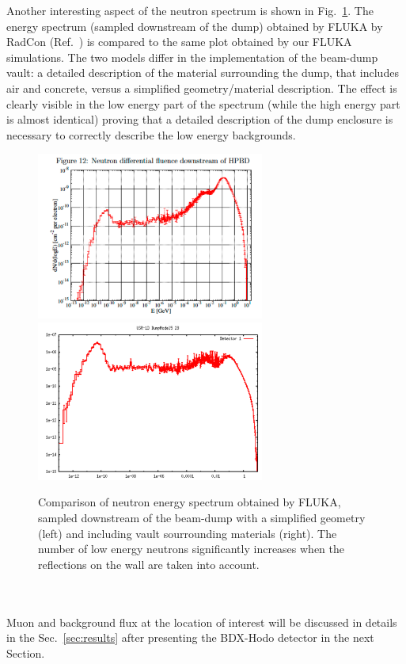 Another interesting aspect of the neutron spectrum is shown in Fig.~\ref{fig:n-lowE}. The energy spectrum (sampled downstream of the dump) obtained by FLUKA by RadCon (Ref.~\cite{jnote-bd}) is compared to the same plot obtained by our FLUKA simulations. The two models differ in the implementation of the  beam-dump vault: a detailed description of the material surrounding the dump,  that includes air and concrete,  versus a simplified geometry/material description.   The effect is clearly visible in the low energy part of the spectrum (while the high energy part is almost identical) proving that a detailed description of the dump enclosure is necessary to correctly describe the low energy backgrounds.
\begin{figure}[h!] 
\center
\includegraphics[width=7.5cm]{figs/bg-lowN-george.pdf}    
\includegraphics[width=7.5cm]{figs/NeutronsDumpComparisonDnDlogE_1D.pdf}   
\caption{Comparison of neutron energy spectrum obtained by FLUKA, sampled downstream of the beam-dump with a simplified geometry (left) and including vault sourrounding materials (right). The number of low energy neutrons significantly increases when the reflections on the wall are taken into account.}
\label{fig:n-lowE}
\end{figure}
\\ \\ 
Muon and background flux  at  the location of interest will be discussed in details in the Sec.~\ref{sec:results} after presenting the BDX-Hodo detector in the next Section. 



